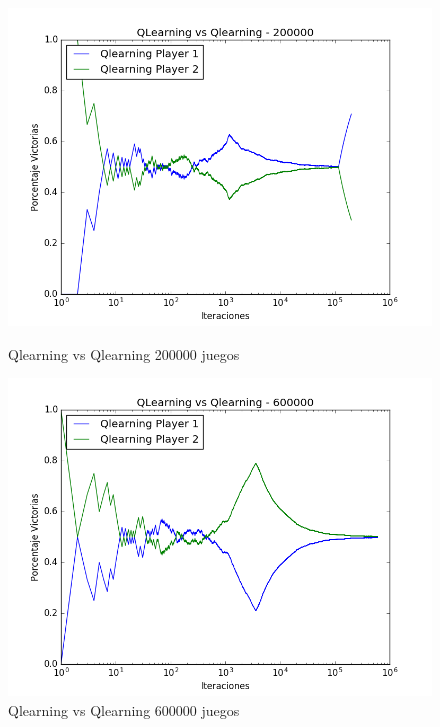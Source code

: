 \begin{figure}[h]
 \centering
 \begin{minipage}{.45\textwidth}
	\centering
	\includegraphics[scale=0.35]{img1/QlearningVsQlearning_200000_6x5_merge.png}
        \caption{Qlearning vs Qlearning 200000 juegos}
  \end{minipage}
 \begin{minipage}{.5\textwidth}
	\centering
	\includegraphics[scale=0.35]{img1/QlearningVsQlearning_600000_6x5_merge.png}
        \caption{Qlearning vs Qlearning 600000 juegos}
  \end{minipage}
\end{figure}



